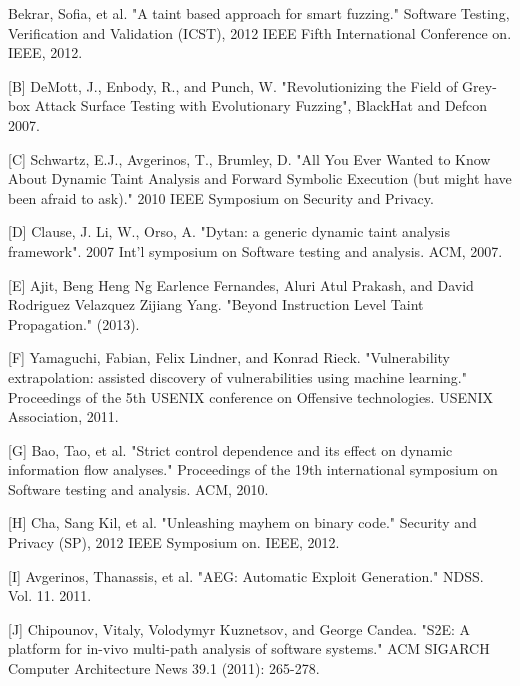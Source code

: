 \documentclass[11pt,expanded,copyright]{fsuthesis}
\begin{document}



\begin{references}
	[A] Bekrar, Sofia, et al. "A taint based approach for smart fuzzing." Software Testing, Verification and Validation (ICST), 2012 IEEE Fifth International Conference on. IEEE, 2012.

	[B] DeMott, J., Enbody, R., and Punch, W. "Revolutionizing the Field of Grey-box Attack Surface Testing with Evolutionary Fuzzing", BlackHat and Defcon 2007.
	
	[C] Schwartz, E.J., Avgerinos, T., Brumley, D. "All You Ever Wanted to Know About Dynamic Taint Analysis and Forward Symbolic Execution (but might have been afraid to ask)." 2010 IEEE Symposium on Security and Privacy.

	[D] Clause, J. Li, W., Orso, A. "Dytan: a generic dynamic taint analysis framework". 2007 Int'l symposium on Software testing and analysis. ACM, 2007.
	
	[E] Ajit, Beng Heng Ng Earlence Fernandes, Aluri Atul Prakash, and David Rodriguez Velazquez Zijiang Yang. "Beyond Instruction Level Taint Propagation." (2013).
	
	[F] Yamaguchi, Fabian, Felix Lindner, and Konrad Rieck. "Vulnerability extrapolation: assisted discovery of vulnerabilities using machine learning." Proceedings of the 5th USENIX conference on Offensive technologies. USENIX Association, 2011.

	[G] Bao, Tao, et al. "Strict control dependence and its effect on dynamic information flow analyses." Proceedings of the 19th international symposium on Software testing and analysis. ACM, 2010.

	[H] Cha, Sang Kil, et al. "Unleashing mayhem on binary code." Security and Privacy (SP), 2012 IEEE Symposium on. IEEE, 2012.

	[I] Avgerinos, Thanassis, et al. "AEG: Automatic Exploit Generation." NDSS. Vol. 11. 2011.

	[J] Chipounov, Vitaly, Volodymyr Kuznetsov, and George Candea. "S2E: A platform for in-vivo multi-path analysis of software systems." ACM SIGARCH Computer Architecture News 39.1 (2011): 265-278.


\end{references}
\end{document}
